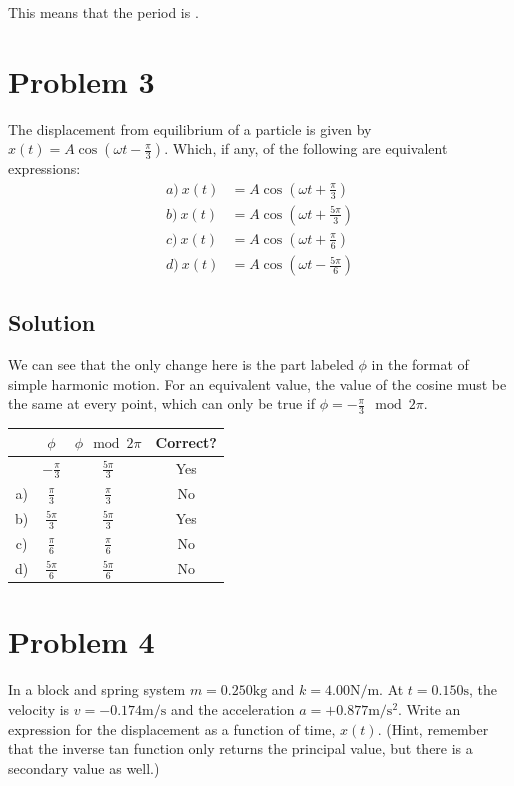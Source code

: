 \documentclass[12pt]{article}
\begin{document}
This means that the period is .
\pagebreak
\section{Problem 3}
The displacement from equilibrium of a particle is given by \(x(t) = A \cos\left(\omega t - \frac{\pi}{3}\right)\). Which, if any, of the following are equivalent expressions:
\begin{align}
    a)\ x(t)    &=  A\cos\left(\omega t + \frac{\pi}{3}\right)\\
    b)\ x(t)    &=  A\cos\left(\omega t + \frac{5\pi}{3}\right)\\
    c)\ x(t)    &=  A\cos\left(\omega t + \frac{\pi}{6}\right)\\
    d)\ x(t)    &=  A\cos\left(\omega t - \frac{5\pi}{6}\right)
\end{align}

\subsection{Solution}
We can see that the only change here is the part labeled $\phi$ in the format of simple harmonic motion. For an equivalent value, the value of the cosine must be the same at every point, which can only be true if \(\phi = -\frac{\pi}{3} \mod 2\pi\).

\begin{tabular}{c | c | c | c}
        &   $\phi$  &   $\phi\mod 2\pi$ &   Correct?\\ \hline
        &   $-\frac{\pi}{3}$    &   $\frac{5\pi}{3}$    &   Yes\\
    a)  &   $\frac{\pi}{3}$     &   $\frac{\pi}{3}$     &   No\\
    b)  &   $\frac{5\pi}{3}$    &   $\frac{5\pi}{3}$    &   Yes\\
    c)  &   $\frac{\pi}{6}$     &   $\frac{\pi}{6}$     &   No\\
    d)  &   $\frac{5\pi}{6}$    &   $\frac{5\pi}{6}$    &   No
\end{tabular}

\pagebreak
\section{Problem 4}
In a block and spring system $m = 0.250 \unit{\kilo\gram}$ and $k = 4.00 \unit{\newton/\meter}$. At $t = 0.150 \unit{\second}$, the velocity is $v = -0.174 \unit{\meter/\second}$ and the acceleration $a = +0.877 \unit{\meter/\second^2}$. Write an expression for the displacement as a function of time, $x(t)$. (Hint, remember that the inverse tan function only returns the principal value, but there is a secondary value as well.)
\end{document}
